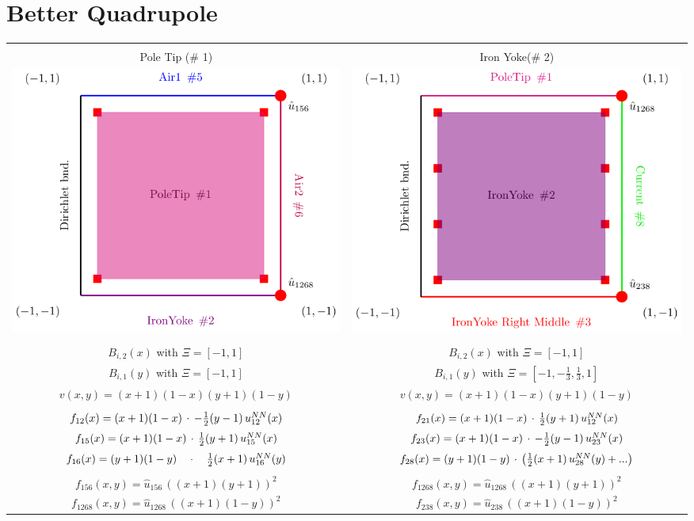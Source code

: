 \documentclass[12pt]{article}
\begin{document}
\section*{Better Quadrupole}
\begin{tabular}{c|c}
		\hline \hline \\[-1.25ex]
		Pole Tip (\# 1) & Iron Yoke(\# 2) \\
		\hline
		
		\includegraphics[width=0.5 \linewidth]{./standalones/PoleTip.pdf}
		&		 
		\includegraphics[width=0.5 \linewidth]{./standalones/IronYoke.pdf}
		\\
		\hline \\[-0.75ex]
		$B_{i,2}(x)$ with $\Xi = \left[-1,1\right]$ 
		& 
		$B_{i,2}(x)$ with $\Xi = \left[-1,1\right]$
		\\ [0.75ex]
		$B_{i,1}(y)$ with $\Xi = \left[-1,1\right]$ 
		& 
		$B_{i,1}(y)$ with $\Xi = \left[-1,-\frac{1}{3}, \frac{1}{3}, 1\right]$
		\\ [0.75ex]
		$v(x,y)=(x+1)(1-x)(y+1)(1-y)$ 
		&
		$v(x,y)=(x+1)(1-x)(y+1)(1-y)$
		\\ [0.75ex]
		\hline
		\\
		$f_{12}(x)=(x+1)(1-x) \, \cdot \, - \frac{1}{2}(y-1) \, u^{\tiny NN}_{12}(x)$
		&
		$f_{21}(x)= (x+1)(1-x) \, \cdot \,  \frac{1}{2}(y+1) \, u^{\tiny NN}_{12}(x)$
		\\ [0.75ex]
		$f_{15}(x)=(x+1)(1-x) \, \cdot \, \frac{1}{2}(y+1) \, u^{\tiny NN}_{15}(x)$
		&
		$f_{23}(x)=(x+1)(1-x)\, \cdot \,  -\frac{1}{2}(y-1) \, u^{\tiny NN}_{23}(x)$
		\\ [0.75ex]
		$f_{16}(x)=(y+1)(1-y)  \quad \cdot \quad \frac{1}{2}(x+1) \, u^{\tiny NN}_{16}(y)$ 
		&
		$f_{28}(x)=  (y+1)(1-y)  \, \cdot \, \left(\frac{1}{2}(x+1) \, u^{\tiny NN}_{28}(y)+ ...\right)$
		\\
		\hline
		\\ 
		$f_{156}(x,y)=\hat{u}_{156}\,((x+1)(y+1))^2$ 
		&
		$f_{1268}(x,y)=\hat{u}_{1268}\,((x+1)(y+1))^2$
		\\
		$f_{1268}(x,y)=\hat{u}_{1268}\,((x+1)(1-y))^2$ 
		&
		$f_{238}(x,y)=\hat{u}_{238}\,((x+1)(1-y))^2$
		\\
		\hline
		\hline
\end{tabular}
\end{document}
